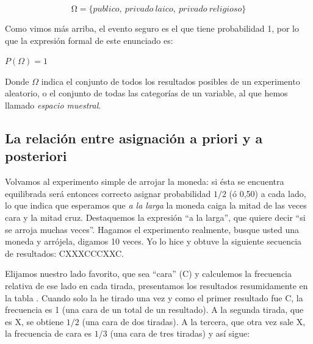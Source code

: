 \documentclass[]{book}
\begin{document}
\[\mathrm{\Omega} = \{ publico,\ privado\ laico,\ privado\ religioso\}\]

Como vimos más arriba, el evento seguro es el que tiene probabilidad 1,
por lo que la expresión formal de este enunciado es:

\(P(\Omega) = 1\)

Donde \(\Omega\) indica el conjunto de todos los resultados posibles de un
experimento aleatorio, o el conjunto de todas las categorías de un
variable, al que hemos llamado \emph{espacio muestral}.

\hypertarget{la-relaciuxf3n-entre-asignaciuxf3n-a-priori-y-a-posteriori}{%
\subsection{La relación entre asignación a priori y a posteriori}\label{la-relaciuxf3n-entre-asignaciuxf3n-a-priori-y-a-posteriori}}

Volvamos al experimento simple de arrojar la moneda: si ésta se
encuentra equilibrada será entonces correcto asignar probabilidad \(1/2\) (ó
0,50) a cada lado, lo que indica que esperamos que \emph{a la larga} la
moneda caiga la mitad de las veces cara y la mitad cruz. Destaquemos la
expresión ``a la larga'', que quiere decir ``si se arroja muchas veces''.
Hagamos el experimento realmente, busque usted una moneda y arrójela,
digamos 10 veces. Yo lo hice y obtuve la siguiente secuencia de
resultados: CXXXCCCXXC.

Elijamos nuestro lado favorito, que sea ``cara'' (C) y calculemos la
frecuencia relativa de ese lado en cada tirada, presentamos los
resultados resumidamente en la tabla . Cuando solo la he tirado una vez
y como el primer resultado fue C, la frecuencia es 1 (una cara de un
total de un resultado). A la segunda tirada, que es X, se obtiene \(1/2\) (una
cara de dos tiradas). A la tercera, que otra vez sale X, la frecuencia
de cara es \(1/3\) (una cara de tres tiradas) y así sigue:
\end{document}
